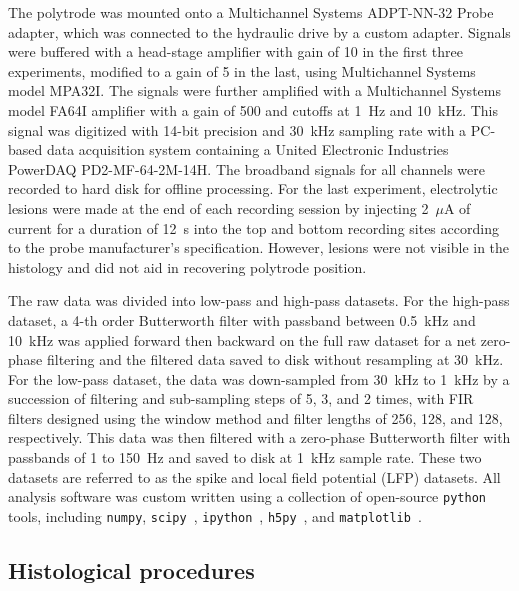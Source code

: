 
The polytrode was mounted onto a Multichannel Systems ADPT-NN-32 Probe
adapter, which was connected to the hydraulic drive by a custom
adapter.  Signals were buffered with a head-stage amplifier with gain
of 10 in the first three experiments, modified to a gain of 5 in the
last, using Multichannel Systems model MPA32I. The signals were
further amplified with a Multichannel Systems model FA64I amplifier
with a gain of 500 and cutoffs at 1~Hz and 10~kHz.  This signal was
digitized with 14-bit precision and 30~kHz sampling rate with a
PC-based data acquisition system containing a United Electronic
Industries PowerDAQ PD2-MF-64-2M-14H. The broadband signals for all
channels were recorded to hard disk for offline processing. For the
last experiment, electrolytic lesions were made at the end of each
recording session by injecting 2~$\mu$A of current for a duration of
12~s into the top and bottom recording sites according to the probe
manufacturer's specification. However, lesions were not visible in the
histology and did not aid in recovering polytrode position.


The raw data was divided into low-pass and high-pass datasets. For the
high-pass dataset, a 4-th order Butterworth filter with passband
between 0.5~kHz and 10~kHz was applied forward then backward on the
full raw dataset for a net zero-phase filtering and the filtered data
saved to disk without resampling at 30~kHz. For the low-pass dataset,
the data was down-sampled from 30~kHz to 1~kHz by a succession of
filtering and sub-sampling steps of 5, 3, and 2 times, with FIR
filters designed using the window method and filter lengths of 256,
128, and 128, respectively. This data was then filtered with a
zero-phase Butterworth filter with passbands of 1 to 150~Hz and saved
to disk at 1~kHz sample rate. These two datasets are referred to as
the spike and local field potential (LFP) datasets. All analysis
software was custom written using a collection of open-source
\texttt{python} tools, including \texttt{numpy},
\texttt{scipy}~\cite{numpyscipy}, \texttt{ipython}~\cite{ipython},
\texttt{h5py}~\cite{h5py}, and \texttt{matplotlib}~\cite{matplotlib}.

\subsection{Histological procedures}

